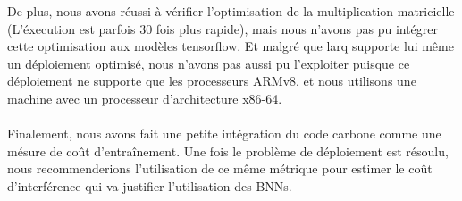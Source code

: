 De plus, nous avons réussi à vérifier l'optimisation de la multiplication matricielle (L'éxecution est parfois 30 fois plus rapide), mais nous n'avons pas pu intégrer cette optimisation aux modèles tensorflow. Et malgré que larq supporte lui même un déploiement optimisé, nous n'avons pas aussi pu l'exploiter puisque ce déploiement ne supporte que les processeurs ARMv8, et nous utilisons une machine avec un processeur d'architecture x86-64.\\
\\
Finalement, nous avons fait une petite intégration du code carbone comme une mésure de coût d'entraînement. Une fois le problème de déploiement est résoulu, nous recommenderions l'utilisation de ce même métrique pour estimer le coût d'interférence qui va justifier l'utilisation des BNNs.   